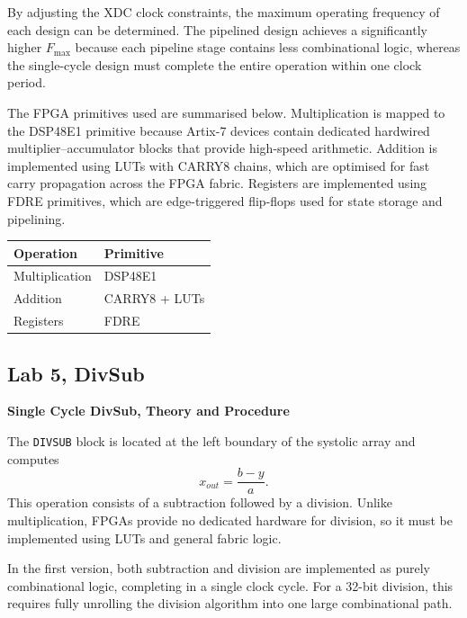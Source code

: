 \documentclass[a4paper,12pt]{article}
\begin{document}
By adjusting the XDC clock constraints, the maximum operating frequency of each design can be determined. The pipelined design achieves a significantly higher $F_{\text{max}}$ because each pipeline stage contains less combinational logic, whereas the single-cycle design must complete the entire operation within one clock period.

The FPGA primitives used are summarised below. Multiplication is mapped to the DSP48E1 primitive because Artix-7 devices contain dedicated hardwired multiplier--accumulator blocks that provide high-speed arithmetic. Addition is implemented using LUTs with CARRY8 chains, which are optimised for fast carry propagation across the FPGA fabric. Registers are implemented using FDRE primitives, which are edge-triggered flip-flops used for state storage and pipelining.

\begin{table}[h]
\centering
\begin{tabular}{l l}
\hline
\textbf{Operation} & \textbf{Primitive} \\
\hline
Multiplication & DSP48E1 \\
Addition & CARRY8 + LUTs \\
Registers & FDRE \\
\hline
\end{tabular}
\end{table}

\subsection{Lab 5, DivSub}

\textbf{Single Cycle DivSub, Theory and Procedure}

The \texttt{DIVSUB} block is located at the left boundary of the systolic array and computes
\begin{equation}
x_{out} = \frac{b - y}{a}.
\end{equation}
This operation consists of a subtraction followed by a division. Unlike multiplication, FPGAs provide no dedicated hardware for division, so it must be implemented using LUTs and general fabric logic.

In the first version, both subtraction and division are implemented as purely combinational logic, completing in a single clock cycle. For a 32-bit division, this requires fully unrolling the division algorithm into one large combinational path.
\end{document}
